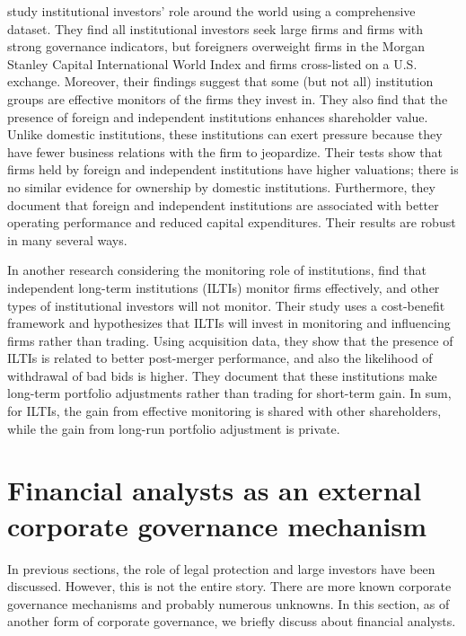 \documentclass[final,1p,authoryear]{elsarticle}
\begin{document}
\cite{RePEc:eee:jfinec:v:88:y:2008:i:3:p:499-533} study institutional investors' role around the world using a comprehensive dataset. They find all institutional investors seek large ﬁrms and ﬁrms with strong governance indicators, but foreigners overweight ﬁrms in the Morgan Stanley Capital International World Index and ﬁrms cross-listed on a U.S. exchange. Moreover, their findings suggest that some (but not all) institution groups are effective monitors of the ﬁrms they invest in. They also find that the presence of foreign and independent institutions enhances shareholder value. Unlike domestic institutions, these institutions can exert pressure because they have fewer business relations with the ﬁrm to jeopardize. Their tests show that ﬁrms held by foreign and independent institutions have higher valuations; there is no similar evidence for ownership by domestic institutions. Furthermore, they document that foreign and independent institutions are associated with better operating performance and reduced capital expenditures. Their results are robust in many several ways.

In another research considering the monitoring role of institutions, \cite{RePEc:eee:jfinec:v:86:y:2007:i:2:p:279-305} find that independent long-term institutions (ILTIs) monitor firms effectively, and other types of institutional investors will not monitor. Their study uses a cost-benefit framework and hypothesizes that ILTIs will invest in monitoring and influencing firms rather than trading. Using acquisition data, they show that the presence of ILTIs is related to better post-merger performance, and also the likelihood of withdrawal of bad bids is higher. They document that these institutions make long-term portfolio adjustments rather than trading for short-term gain. In sum, for ILTIs, the gain from effective monitoring is shared with other shareholders, while the gain from long-run portfolio adjustment is private.


\section{Financial analysts as an external corporate governance mechanism}

In previous sections, the role of legal protection and large investors have been discussed. However, this is not the entire story. There are more known corporate governance mechanisms and probably numerous unknowns. In this section, as of another form of corporate governance, we briefly discuss about financial analysts.
\end{document}
